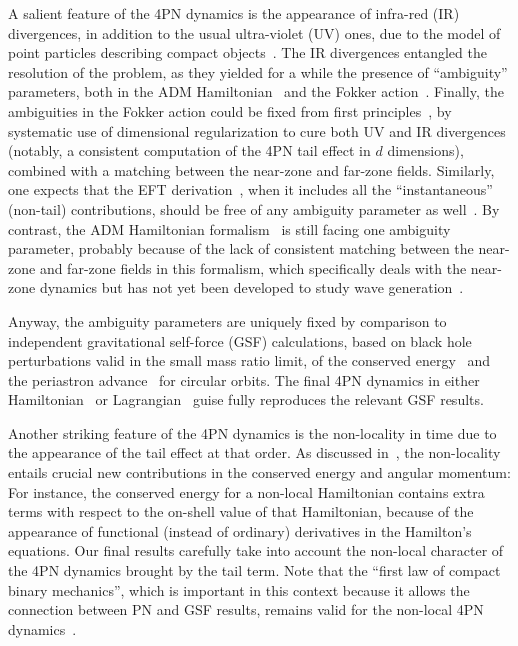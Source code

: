 \documentclass[prd,preprint,superscriptaddress,tightenlines,nofootinbib,
  eqsecnum,showpacs]{revtex4}
\begin{document}
A salient feature of the 4PN dynamics is the appearance of infra-red (IR)
divergences, in addition to the usual ultra-violet (UV) ones, due to the model
of point particles describing compact objects~\cite{BDE04}. The IR divergences
entangled the resolution of the problem, as they yielded for a while the
presence of ``ambiguity'' parameters, both in the ADM Hamiltonian~\cite{DJS14,
  DJS16} and the Fokker action~\cite{BBBFMa, BBBFMb}. Finally, the ambiguities
in the Fokker action could be fixed from first principles~\cite{BBBFMc,
  MBBF17}, by systematic use of dimensional regularization to cure both UV and
IR divergences (notably, a consistent computation of the 4PN tail effect in $d$
dimensions), combined with a matching between the near-zone and far-zone
fields. Similarly, one expects that the EFT derivation~\cite{FS4PN, FMSS16,
  FStail,GLPR16}, when it includes all the ``instantaneous'' (non-tail)
contributions, should be free of any ambiguity parameter as well~\cite{PR17}.
By contrast, the ADM Hamiltonian formalism~\cite{DJS14, DJS16} is still facing
one ambiguity parameter, probably because of the lack of consistent matching
between the near-zone and far-zone fields in this formalism, which
specifically deals with the near-zone dynamics but has not yet been developed
to study wave generation~\cite{S85}.

Anyway, the ambiguity parameters are uniquely fixed by comparison to
independent gravitational self-force (GSF) calculations, based on black hole perturbations valid in the small
mass ratio limit, of the conserved energy~\cite{BDLW10b, LBW12, LBB12,
  BiniD13} and the periastron advance~\cite{BDS10, D10sf, Letal11, DJS15eob,
  vdM16} for circular orbits. The final 4PN dynamics in either
Hamiltonian~\cite{JaraS12, JaraS13, JaraS15, DJS14, DJS16} or
Lagrangian~\cite{BBBFMa, BBBFMb, BBBFMc, MBBF17} guise fully reproduces the
relevant GSF results.

Another striking feature of the 4PN dynamics is the non-locality in time due
to the appearance of the tail effect at that order. As discussed
in~\cite{BBBFMb}, the non-locality entails crucial new contributions in the
conserved energy and angular momentum: For instance, the conserved energy for
a non-local Hamiltonian contains extra terms with respect to the on-shell
value of that Hamiltonian, because of the appearance of functional (instead of ordinary)
derivatives in the Hamilton's equations. Our final results carefully take into
account the non-local character of the 4PN dynamics brought by the tail term.
Note that the ``first law of compact binary mechanics'', which is
important in this context because it allows the connection between PN and GSF
results, remains valid for the non-local 4PN dynamics~\cite{BL17}.
\end{document}
